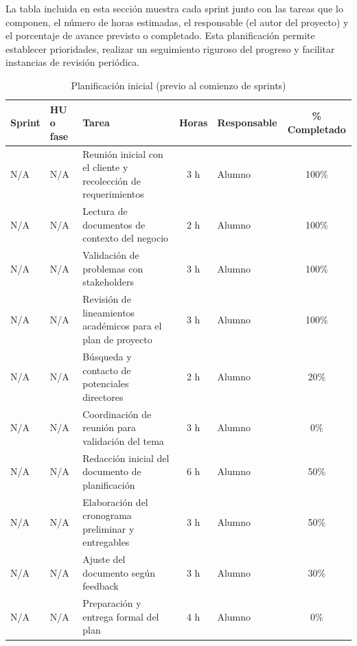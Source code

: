 \documentclass[
11pt, %
]{charter}
\begin{document}
La tabla incluida en esta sección muestra cada sprint junto con las tareas que lo componen, el número de horas estimadas, el responsable (el autor del proyecto) y el porcentaje de avance previsto o completado. Esta planificación permite establecer prioridades, realizar un seguimiento riguroso del progreso y facilitar instancias de revisión periódica.

\begin{table}[htpb]
\centering
\caption{Planificación inicial (previo al comienzo de sprints)}
\begin{tabularx}{\linewidth}{@{}|l|l|X|c|l|c|@{}}
\hline
\rowcolor[HTML]{C0C0C0}
Sprint & HU o fase & Tarea & Horas & Responsable & \% Completado \\ \hline
N/A & N/A & Reunión inicial con el cliente y recolección de requerimientos & 3 h & Alumno & 100\% \\ \hline
N/A & N/A & Lectura de documentos de contexto del negocio & 2 h & Alumno & 100\% \\ \hline
N/A & N/A & Validación de problemas con stakeholders & 3 h & Alumno & 100\% \\ \hline
N/A & N/A & Revisión de lineamientos académicos para el plan de proyecto & 3 h & Alumno & 100\% \\ \hline
N/A & N/A & Búsqueda y contacto de potenciales directores & 2 h & Alumno & 20\% \\ \hline
N/A & N/A & Coordinación de reunión para validación del tema & 3 h & Alumno & 0\% \\ \hline
N/A & N/A & Redacción inicial del documento de planificación & 6 h & Alumno & 50\% \\ \hline
N/A & N/A & Elaboración del cronograma preliminar y entregables & 3 h & Alumno & 50\% \\ \hline
N/A & N/A & Ajuste del documento según feedback & 3 h & Alumno & 30\% \\ \hline
N/A & N/A & Preparación y entrega formal del plan & 4 h & Alumno & 0\% \\ \hline
\end{tabularx}
\end{table}
\end{document}
